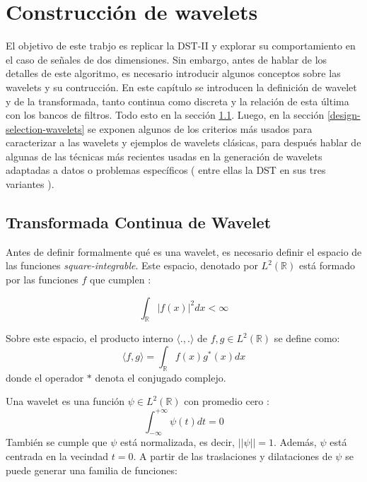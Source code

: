 \chapter{Construcción de wavelets}\label{chapter:state-of-the-art}

El objetivo de este trabjo es replicar la DST-II y explorar su comportamiento en el caso de señales de dos 
dimensiones. Sin embargo, antes de hablar de los detalles de este algoritmo, es necesario introducir
algunos conceptos sobre las wavelets y su contrucción. En este capítulo se introducen la definición de wavelet
y de la transformada, tanto continua como discreta y la relación de esta última con los bancos de filtros. Todo esto
en la sección \ref{wavelet-transform}. Luego, en la sección \ref{design-selection-wavelets} se exponen algunos 
de los criterios más usados para caracterizar a las wavelets y ejemplos de wavelets clásicas, para después 
hablar de algunas de las técnicas más recientes usadas en la generación de wavelets adaptadas a datos o problemas
específicos ( entre ellas la DST en sus tres variantes ).

\section{Transformada Continua de Wavelet}\label{wavelet-transform}

Antes de definir formalmente qué es una wavelet, es necesario definir el espacio de las funciones \textit{square-integrable}.
Este espacio, denotado por $L^2(\mathbb{R})$ está formado por las funciones $f$ que cumplen \cite{frazier}:

\begin{equation}
	\int_{\mathbb{R}} |f(x)|^2 dx < \infty
\end{equation}

Sobre este espacio, el producto interno $\langle .,. \rangle$ de $f,g \in L^2(\mathbb{R})$ se define como:
\begin{equation}
	\langle f,g \rangle = \int_{\mathbb{R}} f(x)g^*(x) dx
\end{equation}
\noindent donde el operador $*$ denota el conjugado complejo.

Una wavelet es una función $\psi \in L^2(\mathbb{R})$ con promedio cero \cite{Mallat2008}:
\begin{equation}
	\int_{-\infty}^{+\infty} \psi(t) dt = 0
\end{equation}
También se cumple que $\psi$ está normalizada, es decir, $||\psi||=1$. Además, $\psi$ está centrada en la vecindad
$t=0$. A partir de las traslaciones y dilataciones de $\psi$ se puede generar una familia de funciones:

